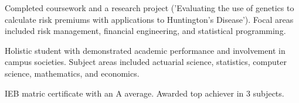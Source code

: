 \documentclass[10pt,a4paper,ragged2e,withhyper]{altacv}
\begin{document}
\begin{paracol}{2}
	    \bigskip 

        
	    \smallskip
	    Completed coursework and a research project ('Evaluating the use of genetics to\\ calculate risk premiums with applications to Huntington's Disease'). Focal areas\\ included risk management, financial engineering, and statistical programming.

            \bigskip
	    Holistic student with demonstrated academic performance and involvement in\\ campus societies. Subject areas included actuarial science, statistics, computer\\ science, mathematics, and economics.

            \bigskip
	      IEB matric certificate with an A average. Awarded top achiever in 3 subjects.

        

    \end{paracol}
\end{document}
